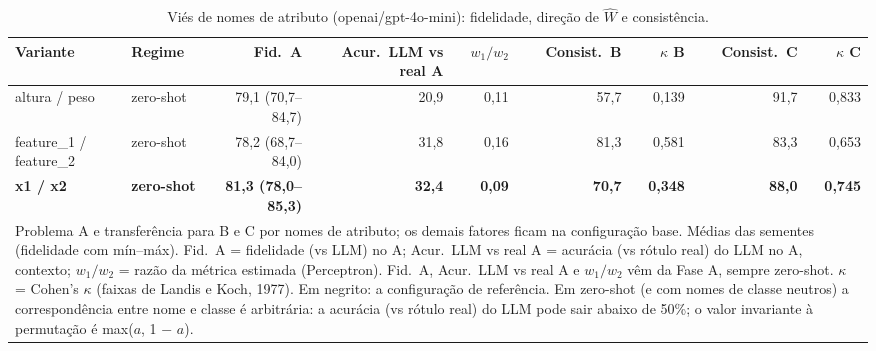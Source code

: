 \begin{table}[htbp]
\centering
\small
\caption{Viés de nomes de atributo (openai/gpt-4o-mini): fidelidade, direção de $\hat{W}$ e consistência.}
\label{tab:bloco1_vies_nomes_atributo_gpt4mini}
\begin{tabular}{llrrrrrrr}
\toprule
Variante & Regime & Fid.\ A & Acur.\ LLM vs real A & $w_1/w_2$ & Consist.\ B & $\kappa$ B & Consist.\ C & $\kappa$ C \\
\midrule
altura / peso & zero-shot & 79,1 (70,7–84,7) & 20,9 & 0,11 & 57,7 & 0,139 & 91,7 & 0,833 \\
feature\_1 / feature\_2 & zero-shot & 78,2 (68,7–84,0) & 31,8 & 0,16 & 81,3 & 0,581 & 83,3 & 0,653 \\
\textbf{x1 / x2} & \textbf{zero-shot} & \textbf{81,3 (78,0–85,3)} & \textbf{32,4} & \textbf{0,09} & \textbf{70,7} & \textbf{0,348} & \textbf{88,0} & \textbf{0,745} \\
\bottomrule
\multicolumn{9}{p{0.95\linewidth}}{\footnotesize Problema A e transferência para B e C por nomes de atributo; os demais fatores ficam na configuração base. Médias das sementes (fidelidade com mín–máx). Fid.\ A = fidelidade (vs LLM) no A; Acur.\ LLM vs real A = acurácia (vs rótulo real) do LLM no A, contexto; $w_1/w_2$ = razão da métrica estimada (Perceptron). Fid.\ A, Acur.\ LLM vs real A e $w_1/w_2$ vêm da Fase A, sempre zero-shot. $\kappa$ = Cohen's $\kappa$ (faixas de Landis e Koch, 1977). Em negrito: a configuração de referência. Em zero-shot (e com nomes de classe neutros) a correspondência entre nome e classe é arbitrária: a acurácia (vs rótulo real) do LLM pode sair abaixo de 50\%; o valor invariante à permutação é max($a$, 1 $-$ $a$).} \\
\end{tabular}
\end{table}
